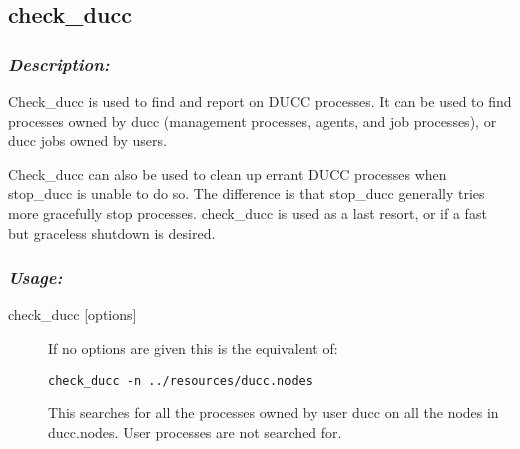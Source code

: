           


\subsection{check\_ducc}

    \subsubsection{{\em Description:}}

    Check\_ducc is used to find and report on DUCC processes. It can be used to find processes 
    owned by ducc (management processes, agents, and job processes), or ducc jobs owned by 
    users. 
    
    Check\_ducc can also be used to clean up errant DUCC processes when stop\_ducc is unable 
    to do so. The difference is that stop\_ducc generally tries more gracefully stop processes. 
    check\_ducc is used as a last resort, or if a fast but graceless shutdown is desired. 
    
    \subsubsection{\em{Usage: }}

        \begin{description} 
          \item[check\_ducc {[options]}]
              If no options are given this is the equivalent of: 
\begin{verbatim}
check_ducc -n ../resources/ducc.nodes 
\end{verbatim}
              
              This searches for all the processes owned by user ducc on all the nodes in ducc.nodes. User 
              processes are not searched for. 
        \end{description}
            
